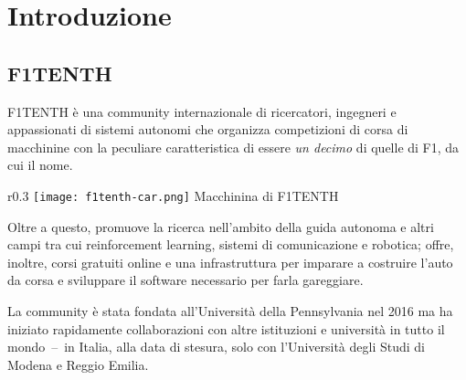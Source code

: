 
\chapter{Introduzione}
\label{chap:intro}


\section{F1TENTH}
F1TENTH è una community internazionale di ricercatori, ingegneri e appassionati di sistemi autonomi
che organizza competizioni di corsa di macchinine con la peculiare caratteristica
di essere \textit{un decimo} di quelle di F1, da cui il nome.
\begin{wrapfigure}{r}{0.3\textwidth}
	\centering
	\texttt{[image: f1tenth-car.png]}
	{\footnotesize Macchinina di F1TENTH}
\end{wrapfigure}
Oltre a questo, promuove la ricerca nell'ambito della guida autonoma
e altri campi tra cui reinforcement learning, sistemi di comunicazione e robotica;
offre, inoltre, corsi gratuiti online e una infrastruttura per imparare a costruire l'auto da corsa
e sviluppare il software necessario per farla gareggiare. \cite{ftenth-web}

La community è stata fondata all'Università della Pennsylvania nel 2016 ma ha iniziato rapidamente
collaborazioni con altre istituzioni e università in tutto il mondo~--~in Italia, alla data di stesura, solo
con l'Università degli Studi di Modena e Reggio Emilia.

